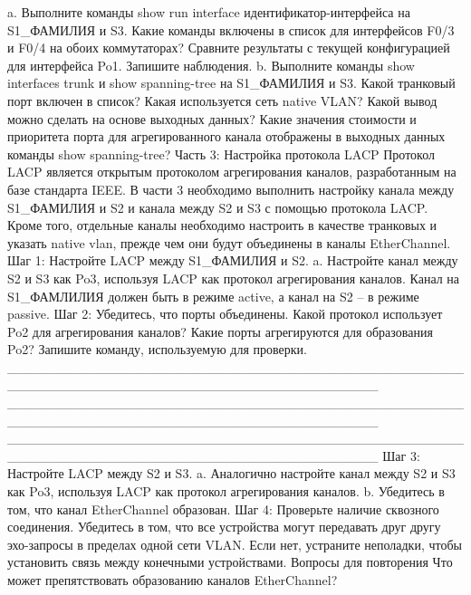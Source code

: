 a. Выполните команды show run interface идентификатор-интерфейса на S1_ФАМИЛИЯ и S3.
Какие команды включены в список для интерфейсов F0/3 и F0/4 на обоих коммутаторах?
Сравните результаты
с текущей конфигурацией для интерфейса Po1. Запишите наблюдения.
b. Выполните команды show interfaces trunk и show spanning-tree на S1_ФАМИЛИЯ и S3. Какой
транковый порт включен в список? Какая используется сеть native VLAN? Какой вывод можно
сделать на основе выходных данных?
Какие значения стоимости и приоритета порта для агрегированного канала отображены
в выходных данных команды show spanning-tree?
Часть 3: Настройка протокола LACP
Протокол LACP является открытым протоколом агрегирования каналов, разработанным на базе
стандарта IEEE. В части 3 необходимо выполнить настройку канала между S1_ФАМИЛИЯ и S2 и
канала между S2 и S3 с помощью протокола LACP. Кроме того, отдельные каналы необходимо
настроить в качестве транковых и указать native vlan, прежде чем они будут объединены в каналы
EtherChannel.
Шаг 1: Настройте LACP между S1_ФАМИЛИЯ и S2.
a. Настройте канал между S2 и S3 как Po3, используя LACP как протокол агрегирования каналов. Канал
на S1_ФАМЛИЛИЯ должен быть в режиме active, а канал на S2 – в режиме passive.
Шаг 2: Убедитесь, что порты объединены.
Какой протокол использует Po2 для агрегирования каналов? Какие порты агрегируются для
образования Po2? Запишите команду, используемую для проверки.
_______________________________________________________________________________________
_______________________________________________________________________________________
_______________________________________________________________________________________
Шаг 3: Настройте LACP между S2 и S3.
a. Аналогично настройте канал между S2 и S3 как Po3, используя LACP как протокол агрегирования
каналов.
b. Убедитесь в том, что канал EtherChannel образован.
Шаг 4: Проверьте наличие сквозного соединения.
Убедитесь в том, что все устройства могут передавать друг другу эхо-запросы в пределах одной сети
VLAN. Если нет, устраните неполадки, чтобы установить связь между конечными устройствами.
Вопросы для повторения
Что может препятствовать образованию каналов EtherChannel?
